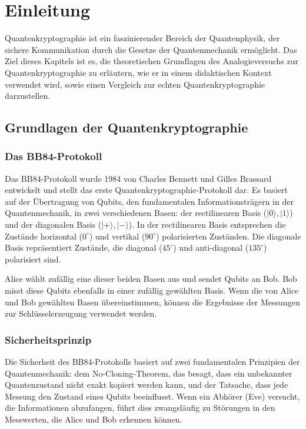 \section{Einleitung}
Quantenkryptographie ist ein faszinierender Bereich der Quantenphysik, der sichere Kommunikation durch die Gesetze der Quantenmechanik ermöglicht. Das Ziel dieses Kapitels ist es, die theoretischen Grundlagen des Analogieversuchs zur Quantenkryptographie zu erläutern, wie er in einem didaktischen Kontext verwendet wird, sowie einen Vergleich zur echten Quantenkryptographie darzustellen.

\subsection{Grundlagen der Quantenkryptographie}
\subsubsection{Das BB84-Protokoll}
Das BB84-Protokoll wurde 1984 von Charles Bennett und Gilles Brassard entwickelt und stellt das erste Quantenkryptographie-Protokoll dar. Es basiert auf der Übertragung von Qubits, den fundamentalen Informationsträgern in der Quantenmechanik, in zwei verschiedenen Basen: der rectilinearen Basis (\( |0\rangle, |1\rangle \)) und der diagonalen Basis (\( |+\rangle, |-\rangle \)). In der rectilinearen Basis entsprechen die Zustände horizontal (\(0^\circ\)) und vertikal (\(90^\circ\)) polarisierten Zuständen. Die diagonale Basis repräsentiert Zustände, die diagonal (\(45^\circ\)) und anti-diagonal (\(135^\circ\)) polarisiert sind.

Alice wählt zufällig eine dieser beiden Basen aus und sendet Qubits an Bob. Bob misst diese Qubits ebenfalls in einer zufällig gewählten Basis. Wenn die von Alice und Bob gewählten Basen übereinstimmen, können die Ergebnisse der Messungen zur Schlüsselerzeugung verwendet werden.

\subsubsection{Sicherheitsprinzip}
Die Sicherheit des BB84-Protokolls basiert auf zwei fundamentalen Prinzipien der Quantenmechanik: dem No-Cloning-Theorem, das besagt, dass ein unbekannter Quantenzustand nicht exakt kopiert werden kann, und der Tatsache, dass jede Messung den Zustand eines Qubits beeinflusst. Wenn ein Abhörer (Eve) versucht, die Informationen abzufangen, führt dies zwangsläufig zu Störungen in den Messwerten, die Alice und Bob erkennen können.

